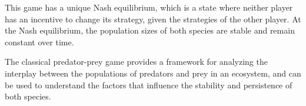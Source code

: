 This game has a unique Nash equilibrium, which is a state where neither player has an incentive to change its strategy, given the strategies of the other player. At the Nash equilibrium, the population sizes of both species are stable and remain constant over time.

The classical predator-prey game provides a framework for analyzing the interplay between the populations of predators and prey in an ecosystem, and can be used to understand the factors that influence the stability and persistence of both species.
